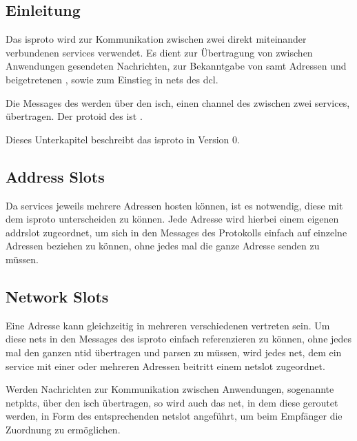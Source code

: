 
\subsection{Einleitung}
Das \gls{isproto} wird zur Kommunikation zwischen zwei direkt miteinander verbundenen \glspl{service}
verwendet.
Es dient zur Übertragung von zwischen Anwendungen gesendeten Nachrichten, zur
Bekanntgabe von  samt Adressen und beigetretenen
, sowie zum Einstieg in \glspl{net} des \gls{dcl}.

Die Messages des  werden über den
\gls{isch}, einen \gls{channel} des  zwischen zwei
\glspl{service}, übertragen. Der \gls{protoid} des
 ist .

Dieses Unterkapitel beschreibt das \gls{isproto} in Version 0.

\subsection{Address Slots}
Da \glspl{service} jeweils mehrere Adressen hosten können, ist es notwendig, diese mit dem
\gls{isproto} unterscheiden zu können. Jede Adresse wird hierbei einem eigenen \gls{addrslot}
zugeordnet, um sich in den Messages des Protokolls einfach auf einzelne Adressen beziehen zu können,
ohne jedes mal die ganze Adresse senden zu müssen.

\subsection{Network Slots}
Eine Adresse kann gleichzeitig in mehreren verschiedenen  vertreten sein. Um diese
\glspl{net} in den Messages des \gls{isproto} einfach referenzieren zu können, ohne jedes mal den
ganzen \gls{ntid} übertragen und parsen zu müssen, wird jedes \gls{net}, dem ein \gls{service} mit einer
oder mehreren Adressen beitritt einem \gls{netslot} zugeordnet.

Werden Nachrichten zur Kommunikation zwischen Anwendungen, sogenannte
\glspl{netpkt}, über den \gls{isch} übertragen, so wird auch das \gls{net}, in
dem diese geroutet werden, in Form des entsprechenden \gls{netslot} angeführt,
um beim Empfänger die Zuordnung zu ermöglichen.

